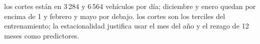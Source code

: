 {los cortes están en 3\,284 y 6\,564 vehículos por día; diciembre y enero quedan por encima de 1 y febrero y mayo por debajo.}
{los cortes son los terciles del entrenamiento; la estacionalidad justifica usar el mes del año y el rezago de 12 meses como predictores.}
